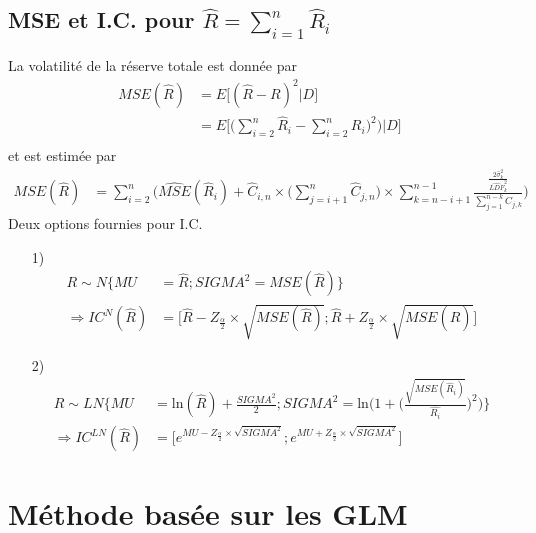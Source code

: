 \documentclass[11pt,french]{report}
\begin{document}
\subsection*{MSE et I.C. pour $\widehat{R} = \sum_{i=1}^{n}\widehat{R}_i$}
La volatilité de la réserve totale est donnée par
\begin{align*}
MSE(\widehat{R}) &= E \Big[ (\widehat{R} - R)^2 |D \Big] \\
&= E \Bigg[ \bigg( \sum_{i=2}^{n} \widehat{R}_i -  \sum_{i=2}^{n} R_i)^2\bigg) \Big|D \Bigg] \\
\end{align*}
et est estimée par
\begin{align*}
MSE(\widehat{R}) &= \sum_{i=2}^{n} \Bigg( \widehat{MSE}(\widehat{R}_i) + \widehat{C}_{i,n} \times \Big( \sum_{j = i + 1}^{n} \widehat{C}_{j,n} \Big) \times \sum_{k = n - i + 1}^{n-1} \frac{\frac{2 \widehat{\sigma}_k^2}{\widehat{LDF}_k^2}}{\sum_{j=1}^{n-k} C_{j,k}}  \Bigg)
\end{align*}
Deux options fournies pour I.C.
\begin{itemize}
\item[1)] \begin{align*}
R \sim N \bigg\lbrace MU &= \widehat{R}; SIGMA^2 = MSE(\widehat{R}) \bigg\rbrace \\
\Rightarrow IC^N(\widehat{R}) &= \bigg[ \widehat{R} - Z_{\frac{\alpha}{2}} \times \sqrt{MSE(\widehat{R})}; \widehat{R} + Z_{\frac{\alpha}{2}} \times \sqrt{MSE(\widehat{R})} \bigg]
\end{align*}
\item[2)] \begin{align*}
R \sim LN \Bigg\lbrace MU &= \text{ln} (\widehat{R}) + \frac{SIGMA^2}{2}; SIGMA^2 = \text{ln} \Bigg( 1 + \Bigg( \frac{\sqrt{MSE(\widehat{R}_i)}}{\widehat{R_i}}\Bigg)^2 \Bigg) \Bigg\rbrace \\
\Rightarrow IC^{LN}(\widehat{R}) &= \bigg[ e^{MU - Z_{\frac{\alpha}{2}} \times \sqrt{SIGMA^2}}; e^{MU + Z_{\frac{\alpha}{2}} \times \sqrt{SIGMA^2}} \bigg]
\end{align*}
\end{itemize}

\section{Méthode basée sur les GLM}
\end{document}
